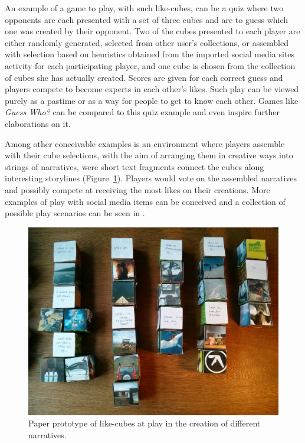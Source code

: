 \documentclass[conference]{IEEETran}
\begin{document}
An example of a game to play, with such like-cubes, can be a quiz where two opponents are each presented with a set of three cubes and are to guess which one was created by their opponent.  Two of the cubes presented to each player are either randomly generated, selected from other user's collections, or assembled with selection based on heuristics obtained from the imported social media sites activity for each participating player, and one cube is chosen from the collection of cubes she has actually created.  Scores are given for each correct guess and players compete to become experts in each other's likes.  Such play can be viewed purely as a pastime or as a way for people to get to know each other.  Games like \textit{Guess Who?}\cite{GuessWho} can be compared to this quiz example and even inspire further elaborations on it.

Among other conceivable examples is an environment where players assemble with their cube selections, with the aim of arranging them in creative ways into strings of narratives, were short text fragments connect the cubes along interesting storylines (Figure~\ref{fig:narratives}).  Players would vote on the assembled narratives and possibly compete at receiving the most likes on their creations.  More examples of play with social media items can be conceived and a collection of possible play scenarios can be seen in \cite{GoLplay}.

\begin{figure}[h!]
	\centerline{\includegraphics[width=\columnwidth]{IMG_20141029_110139.jpg}}
	\caption{Paper prototype of like-cubes at play in the creation of different narratives.}
	\label{fig:narratives}
\end{figure}
\end{document}
